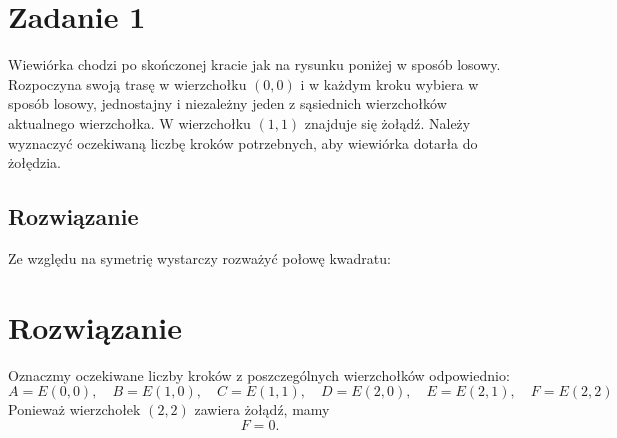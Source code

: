 \section{Zadanie 1}
Wiewiórka chodzi po skończonej kracie jak na rysunku poniżej w sposób losowy.
Rozpoczyna swoją trasę w wierzchołku \((0,0)\) i w każdym kroku wybiera w sposób losowy, jednostajny i niezależny jeden z sąsiednich wierzchołków aktualnego wierzchołka.
W wierzchołku \((1,1)\) znajduje się żołądź.
Należy wyznaczyć oczekiwaną liczbę kroków potrzebnych, aby wiewiórka dotarła do żołędzia.


\subsection*{Rozwiązanie}
Ze względu na symetrię wystarczy rozważyć połowę kwadratu:



\section*{Rozwiązanie}

Oznaczmy oczekiwane liczby kroków z poszczególnych wierzchołków odpowiednio:
\[
	A = E(0,0), \quad
	B = E(1,0), \quad
	C = E(1,1), \quad
	D = E(2,0), \quad
	E = E(2,1), \quad
	F = E(2,2)
\]
Ponieważ wierzchołek \((2,2)\) zawiera żołądź, mamy
\[
	F = 0.
\]

